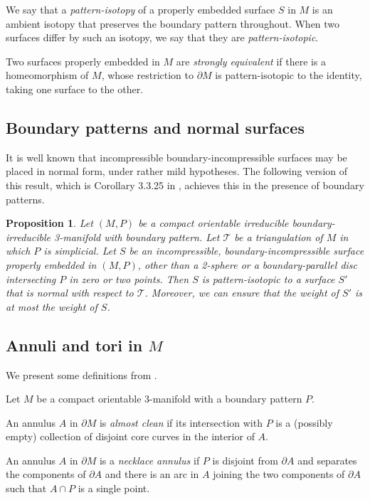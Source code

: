 \documentclass[oneside]{amsart}
\numberwithin{equation}{section}
\theoremstyle{plain}
\newtheorem{proposition}[equation]{Proposition}
\theoremstyle{definition}
\begin{document}
We say that a \emph{pattern-isotopy} of a properly embedded surface $S$ in $M$ 
is an ambient isotopy that preserves the boundary pattern throughout. When two surfaces differ by 
such an isotopy, we say that they are \emph{pattern-isotopic}.

Two surfaces properly embedded in $M$ are \emph{strongly equivalent} if there is a homeomorphism
of $M$, whose restriction to $\partial M$ is pattern-isotopic to the identity, taking one surface to the other.

\subsection{Boundary patterns and normal surfaces}

It is well known that incompressible boundary-incompressible surfaces may be placed in normal form, under rather mild hypotheses.
The following version of this result, which is Corollary 3.3.25 in \cite{Matveev}, achieves this in the presence of boundary patterns.

\begin{proposition}
\label{Prop:IsotopicToNormal}
\sloppy
Let $(M,P)$ be a compact orientable irreducible boundary-irreducible 3-manifold
with boundary pattern. Let $\mathcal{T}$ be a triangulation of $M$ in which
$P$ is simplicial. Let $S$ be an incompressible, boundary-incompressible surface properly embedded in $(M,P)$,
other than a 2-sphere or a boundary-parallel disc intersecting $P$ in zero or two points.
Then $S$ is pattern-isotopic to a surface $S'$ that is normal with respect to $\mathcal{T}$.
Moreover, we can ensure that the weight of $S'$ is at most the weight of $S$. 
\end{proposition}


\subsection{Annuli and tori in $M$}

We present some definitions from \cite{Matveev}.

Let $M$ be a compact orientable 3-manifold with a boundary pattern $P$.

An annulus $A$ in $\partial M$ is \emph{almost clean} if its intersection with $P$ is
a (possibly empty) collection of disjoint core curves in the interior of $A$.

An annulus $A$ in $\partial M$ is a \emph{necklace annulus} if $P$ is disjoint from $\partial A$ and separates the components
of $\partial A$ and there is an arc in $A$ joining the two components of $\partial A$ such that
$A \cap P$ is a single point.
\end{document}
